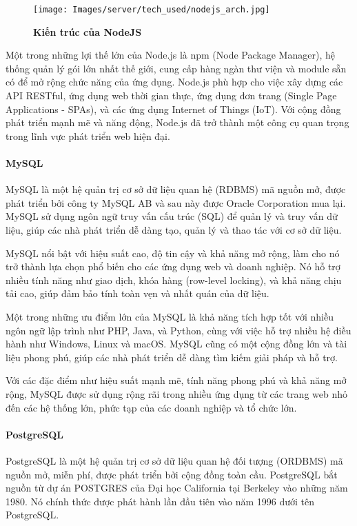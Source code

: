 \begin{figure}[H]
  \centering
  \texttt{[image: Images/server/tech\_used/nodejs\_arch.jpg]}
  \caption[Kiến trúc của NodeJS]{\bfseries \fontsize{12pt}{0pt}
  \selectfont Kiến trúc của NodeJS}
  \label{ble_services} %
\end{figure}
Một trong những lợi thế lớn của Node.js là npm (Node Package Manager), hệ thống quản lý gói lớn nhất thế giới, cung cấp hàng ngàn thư viện và module sẵn có để mở rộng chức năng của ứng dụng. Node.js phù hợp cho việc xây dựng các API RESTful, ứng dụng web thời gian thực, ứng dụng đơn trang (Single Page Applications - SPAs), và các ứng dụng Internet of Things (IoT). Với cộng đồng phát triển mạnh mẽ và năng động, Node.js đã trở thành một công cụ quan trọng trong lĩnh vực phát triển web hiện đại.

\paragraph{MySQL}
\mbox{}

MySQL là một hệ quản trị cơ sở dữ liệu quan hệ (RDBMS) mã nguồn mở, được phát triển bởi công ty MySQL AB và sau này được Oracle Corporation mua lại. MySQL sử dụng ngôn ngữ truy vấn cấu trúc (SQL) để quản lý và truy vấn dữ liệu, giúp các nhà phát triển dễ dàng tạo, quản lý và thao tác với cơ sở dữ liệu.

MySQL nổi bật với hiệu suất cao, độ tin cậy và khả năng mở rộng, làm cho nó trở thành lựa chọn phổ biến cho các ứng dụng web và doanh nghiệp. Nó hỗ trợ nhiều tính năng như giao dịch, khóa hàng (row-level locking), và khả năng chịu tải cao, giúp đảm bảo tính toàn vẹn và nhất quán của dữ liệu.

Một trong những ưu điểm lớn của MySQL là khả năng tích hợp tốt với nhiều ngôn ngữ lập trình như PHP, Java, và Python, cùng với việc hỗ trợ nhiều hệ điều hành như Windows, Linux và macOS. MySQL cũng có một cộng đồng lớn và tài liệu phong phú, giúp các nhà phát triển dễ dàng tìm kiếm giải pháp và hỗ trợ.

Với các đặc điểm như hiệu suất mạnh mẽ, tính năng phong phú và khả năng mở rộng, MySQL được sử dụng rộng rãi trong nhiều ứng dụng từ các trang web nhỏ đến các hệ thống lớn, phức tạp của các doanh nghiệp và tổ chức lớn.
\paragraph{PostgreSQL}
\mbox{}

PostgreSQL là một hệ quản trị cơ sở dữ liệu quan hệ đối tượng (ORDBMS) mã nguồn mở, miễn phí, được phát triển bởi cộng đồng toàn cầu. PostgreSQL bắt nguồn từ dự án POSTGRES của Đại học California tại Berkeley vào những năm 1980. Nó chính thức được phát hành lần đầu tiên vào năm 1996 dưới tên PostgreSQL.

